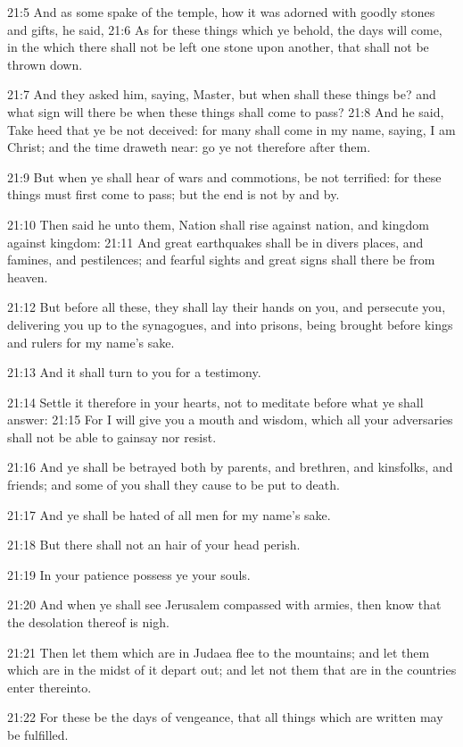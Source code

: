 21:5 And as some spake of the temple, how it was adorned with goodly
stones and gifts, he said, 21:6 As for these things which ye behold,
the days will come, in the which there shall not be left one stone
upon another, that shall not be thrown down.

21:7 And they asked him, saying, Master, but when shall these things
be?  and what sign will there be when these things shall come to pass?
21:8 And he said, Take heed that ye be not deceived: for many shall
come in my name, saying, I am Christ; and the time draweth near: go ye
not therefore after them.

21:9 But when ye shall hear of wars and commotions, be not terrified:
for these things must first come to pass; but the end is not by and
by.

21:10 Then said he unto them, Nation shall rise against nation, and
kingdom against kingdom: 21:11 And great earthquakes shall be in
divers places, and famines, and pestilences; and fearful sights and
great signs shall there be from heaven.

21:12 But before all these, they shall lay their hands on you, and
persecute you, delivering you up to the synagogues, and into prisons,
being brought before kings and rulers for my name's sake.

21:13 And it shall turn to you for a testimony.

21:14 Settle it therefore in your hearts, not to meditate before what
ye shall answer: 21:15 For I will give you a mouth and wisdom, which
all your adversaries shall not be able to gainsay nor resist.

21:16 And ye shall be betrayed both by parents, and brethren, and
kinsfolks, and friends; and some of you shall they cause to be put to
death.

21:17 And ye shall be hated of all men for my name's sake.

21:18 But there shall not an hair of your head perish.

21:19 In your patience possess ye your souls.

21:20 And when ye shall see Jerusalem compassed with armies, then know
that the desolation thereof is nigh.

21:21 Then let them which are in Judaea flee to the mountains; and let
them which are in the midst of it depart out; and let not them that
are in the countries enter thereinto.

21:22 For these be the days of vengeance, that all things which are
written may be fulfilled.


